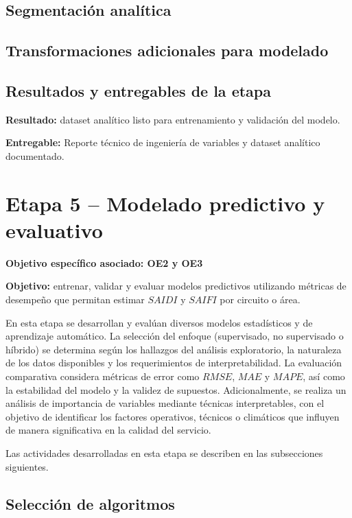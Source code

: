 \subsection{Segmentación analítica}

\subsection{Transformaciones adicionales para modelado}

\subsection{Resultados y entregables de la etapa}

\textbf{Resultado:} dataset analítico listo para entrenamiento y validación del modelo.

\textbf{Entregable:} Reporte técnico de ingeniería de variables y dataset analítico documentado.


\section{Etapa 5 – Modelado predictivo y evaluativo}

\textbf{Objetivo específico asociado: OE2 y OE3}

\textbf{Objetivo:} entrenar, validar y evaluar modelos predictivos utilizando métricas de desempeño que permitan estimar $SAIDI$ y $SAIFI$ por circuito o área.

En esta etapa se desarrollan y evalúan diversos modelos estadísticos y de aprendizaje automático. La selección del enfoque (supervisado, no supervisado o híbrido) se determina según los hallazgos del análisis exploratorio, la naturaleza de los datos disponibles y los requerimientos de interpretabilidad. La evaluación comparativa considera métricas de error como $RMSE$, $MAE$ y $MAPE$, así como la estabilidad del modelo y la validez de supuestos. Adicionalmente, se realiza un análisis de importancia de variables mediante técnicas interpretables, con el objetivo de identificar los factores operativos, técnicos o climáticos que influyen de manera significativa en la calidad del servicio.

Las actividades desarrolladas en esta etapa se describen en las subsecciones siguientes.

\subsection{Selección de algoritmos}

